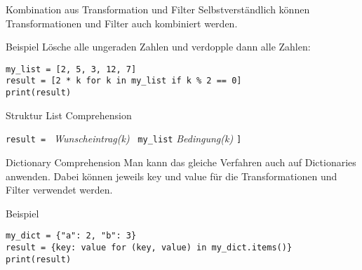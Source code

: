 \begin{fragile}
\begin{block}{Kombination aus Transformation und Filter}
\vspace{2pt}
Selbstverständlich können Transformationen und Filter auch kombiniert werden. 
\end{block}

\vspace{12pt}

\begin{exampleblock}{Beispiel}
\vspace{2pt}
Lösche alle ungeraden Zahlen und verdopple dann alle Zahlen: 

\begin{verbatim}
my_list = [2, 5, 3, 12, 7]
result = [2 * k for k in my_list if k % 2 == 0]
print(result)
\end{verbatim}
\end{exampleblock}

\end{fragile}


\begin{frame}


\begin{block}{Struktur List Comprehension}	
\vspace{2pt}

\texttt{result = }
\pause {\Large\texttt{[}}
\pause\textit{Wunscheintrag(k)} \,
\pause {} 
\pause {} 
\pause {} 
\pause \texttt{my\_list} 
\pause {} 
\pause \textit{Bedingung(k)}
\pause \Large{\texttt{]}}

\end{block}

\end{frame}



\begin{fragile}

\begin{block}{Dictionary Comprehension}
\vspace{2pt}
Man kann das gleiche Verfahren auch auf Dictionaries anwenden. Dabei können jeweils key und value für die Transformationen und Filter verwendet werden. 
\end{block}

\vspace{12pt}

\begin{exampleblock}{Beispiel}
\vspace{2pt}
\begin{verbatim}
my_dict = {"a": 2, "b": 3}
result = {key: value for (key, value) in my_dict.items()}
print(result)
\end{verbatim}
\end{exampleblock}

\end{fragile}

